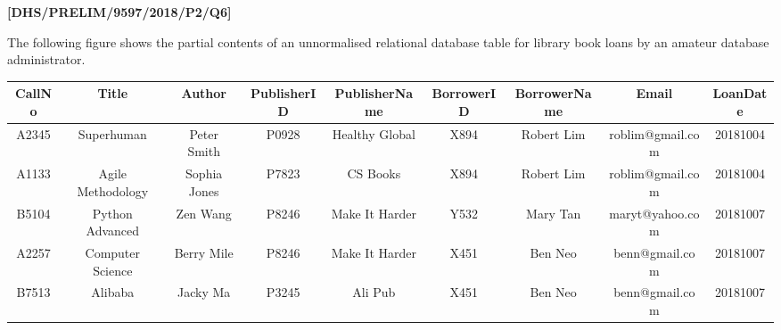 \item \textbf{{[}DHS/PRELIM/9597/2018/P2/Q6{]} }

The following figure shows the partial contents of an unnormalised
relational database table for library book loans by an amateur database
administrator. 
\noindent \begin{center}
\begin{tabular}{|c|c|c|c|c|c|c|c|c|}
\hline 
CallNo & Title & Author & PublisherID & PublisherName & BorrowerID & BorrowerName & Email & LoanDate\tabularnewline
\hline 
A2345 & Superhuman & Peter Smith & P0928 & Healthy Global & X894 & Robert Lim & roblim@gmail.com & 20181004\tabularnewline
\hline 
A1133 & Agile Methodology & Sophia Jones & P7823 & CS Books & X894 & Robert Lim & roblim@gmail.com & 20181004\tabularnewline
\hline 
B5104 & Python Advanced & Zen Wang & P8246 & Make It Harder & Y532 & Mary Tan & maryt@yahoo.com & 20181007\tabularnewline
\hline 
A2257 & Computer Science & Berry Mile & P8246 & Make It Harder & X451 & Ben Neo & benn@gmail.com & 20181007\tabularnewline
\hline 
B7513 & Alibaba & Jacky Ma & P3245 & Ali Pub  & X451 & Ben Neo & benn@gmail.com & 20181007\tabularnewline
\hline 
\end{tabular}
\par\end{center}

